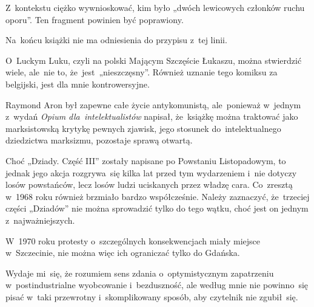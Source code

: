 \documentclass[a4paper,11pt]{article}
\begin{document}
\vspace{\spaceFour}



\start {} Z~kontekstu ciężko wywnioskować, kim było
„dwóch lewicowych członków ruchu oporu”. Ten fragment powinien być
poprawiony.

\vspace{\spaceFour}



\start {} Na~końcu książki nie ma odniesienia do przypisu
z~tej linii.

\vspace{\spaceFour}



\start {} O~Luckym Luku, czyli na polski Mającym
Szczęście Łukaszu, można stwierdzić wiele, ale~nie to,
że~jest~„nieszczęsny”. Również uznanie tego komiksu za belgijski,
jest dla mnie kontrowersyjne.

\vspace{\spaceFour}



\start {} Raymond Aron był zapewne całe życie antykomunistą,
ale~ponieważ w~jednym z~wydań \textit{Opium dla~intelektualistów}
napisał, że~książkę można traktować jako marksistowską krytykę pewnych
zjawisk, jego stosunek do~intelektualnego dziedzictwa marksizmu,
pozostaje sprawą otwartą.

\vspace{\spaceFour}



\start {} Choć „Dziady. Część III” zostały napisane po
Powstaniu Listopadowym, to jednak jego akcja rozgrywa~się kilka lat
przed tym wydarzeniem i~nie dotyczy losów powstańców, lecz losów ludzi
uciskanych przez władzę cara. Co~zresztą w~1968 roku również brzmiało
bardzo współcześnie. Należy zaznaczyć, że~trzeciej części „Dziadów”
nie można sprowadzić tylko do tego wątku, choć jest on jednym
z~najważniejszych.

\vspace{\spaceFour}



\start {} W~1970 roku protesty o~szczególnych
konsekwencjach miały miejsce w~Szczecinie, nie można więc ich
ograniczać tylko do Gdańska.

\vspace{\spaceFour}



\start {} Wydaje mi~się, że rozumiem sens zdania
o~optymistycznym zapatrzeniu w~postindustrialne wyobcowanie
i~bezduszność, ale według mnie nie powinno~się pisać w~taki przewrotny
i~skomplikowany sposób, aby czytelnik nie zgubił~się.
\end{document}
